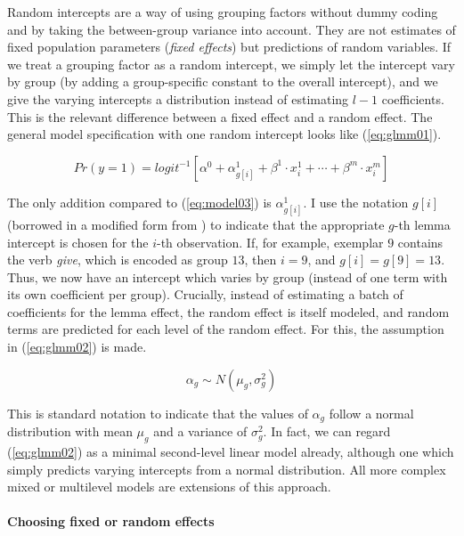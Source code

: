Random intercepts are a way of using grouping factors without dummy coding and by taking the between-group variance into account.
They are not estimates of fixed population parameters (\textit{fixed effects}) but predictions of random variables.
If we treat a grouping factor as a random intercept, we simply let the intercept vary by group (by adding a group-specific constant to the overall intercept), and we give the varying intercepts a distribution instead of estimating $l-1$ coefficients.
This is the relevant difference between a fixed effect and a random effect.
The general model specification with one random intercept looks like (\ref{eq:glmm01}).

\begin{equation}
  Pr(y=1)=logit^{-1}\left[\alpha^0+\alpha^1_{g[i]}+\beta^1\cdot x^1_i+\cdots+\beta^m\cdot x^m_i\right]
  \label{eq:glmm01}
\end{equation}

The only addition compared to (\ref{eq:model03}) is $\alpha^1_{g[i]}$.
I use the notation $g[i]$ (borrowed in a modified form from \citealt{GelmanHill2006}) to indicate that the appropriate $g$-th lemma intercept is chosen for the $i$-th observation.
If, for example, exemplar $9$ contains the verb \textit{give}, which is encoded as group $13$, then $i=9$, and $g[i]=g[9]=13$.
Thus, we now have an intercept which varies by group (instead of one term with its own coefficient per group).
Crucially, instead of estimating a batch of coefficients for the lemma effect, the random effect is itself modeled, and random terms are predicted for each level of the random effect.
For this, the assumption in (\ref{eq:glmm02}) is made.

\begin{equation}
  \alpha_g\sim N(\mu_g,\sigma_g^2)
  \label{eq:glmm02}
\end{equation}

This is standard notation to indicate that the values of $\alpha_g$ follow a normal distribution with mean $\mu_g$ and a variance of $\sigma_g^2$.
In fact, we can regard (\ref{eq:glmm02}) as a minimal second-level linear model already, although one which simply predicts varying intercepts from a normal distribution.
All more complex mixed or multilevel models are extensions of this approach.


\paragraph{Choosing fixed or random effects}

